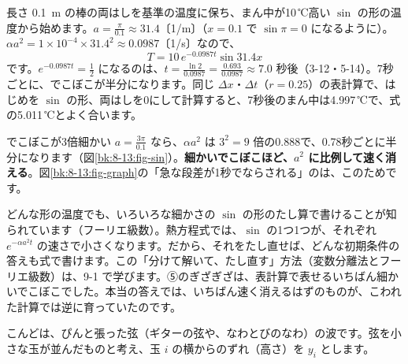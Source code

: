 長さ \qty{0.1}{m} の棒の両はしを基準の温度に保ち、まん中が10\,℃高い $\sin$ の形の温度から始めます。$a=\tfrac{\pi}{0.1}\approx31.4$〔1/m〕（$x=0.1$ で $\sin\pi=0$ になるように）。$\alpha a^2=1\times10^{-4}\times31.4^2\approx0.0987$〔1/s〕なので、
\[ T=10\,e^{-0.0987t}\sin31.4x \]
です。$e^{-0.0987t}=\frac12$ になるのは、$t=\tfrac{\ln2}{0.0987}=\tfrac{0.693}{0.0987}\approx7.0$ 秒後（3-12・5-14）。7秒ごとに、でこぼこが半分になります。同じ $\Delta x$・$\Delta t$（$r=0.25$）の表計算で、はじめを $\sin$ の形、両はしを0にして計算すると、7秒後のまん中は4.997\,℃で、式の5.011\,℃とよく合います。

でこぼこが3倍細かい $a=\tfrac{3\pi}{0.1}$ なら、$\alpha a^2$ は $3^2=9$ 倍の0.888で、0.78秒ごとに半分になります（図\ref{bk:8-13:fig-sin}）。\textbf{細かいでこぼこほど、$a^2$ に比例して速く消える}。図\ref{bk:8-13:fig-graph}の「急な段差が1秒でならされる」のは、このためです。

\begin{motto}[5]
どんな形の温度でも、いろいろな細かさの $\sin$ の形のたし算で書けることが知られています（フーリエ級数）。熱方程式では、$\sin$ の1つ1つが、それぞれ $e^{-\alpha a^2t}$ の速さで小さくなります。だから、それをたし直せば、どんな初期条件の答えも式で書けます。この「分けて解いて、たし直す」方法（変数分離法とフーリエ級数）は、9-1 で学びます。⑤のぎざぎざは、表計算で表せるいちばん細かいでこぼこでした。本当の答えでは、いちばん速く消えるはずのものが、こわれた計算では逆に育っていたのです。
\end{motto}


\label{bk:8-13:nami}こんどは、ぴんと張った弦（ギターの弦や、なわとびのなわ）の波です。弦を小さな玉が並んだものと考え、玉 $i$ の横からのずれ（高さ）を $y_i$ とします。

